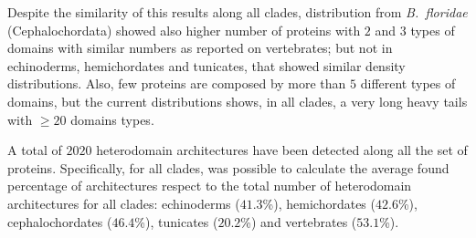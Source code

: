 \documentclass[11pt]{article}
\newcommand{\TODO}[1]{\begingroup\color{red}#1\endgroup}
\begin{document}
Despite the similarity of this results along all clades, distribution 
from \textsl{B.\ floridae} (Cephalochordata) showed also higher number of 
proteins with $2$ and $3$ types of domains with similar numbers as reported 
on vertebrates; but not in echinoderms, hemichordates and tunicates, that 
showed similar density distributions. Also, few proteins are composed by more 
than $5$ different types of domains, but the current distributions shows, in 
all clades, a very long heavy tails with \TODO{$\ge 20$ domains types}.



A total of $2020$ heterodomain architectures have been detected along all
the set of proteins. Specifically, for all clades, was possible to calculate 
the average found percentage of architectures respect to the total number of 
heterodomain architectures for all clades: echinoderms ($41.3$\%), 
hemichordates ($42.6$\%), cephalochordates ($46.4$\%), tunicates 
($20.2$\%) and vertebrates ($53.1$\%). 
\end{document}
